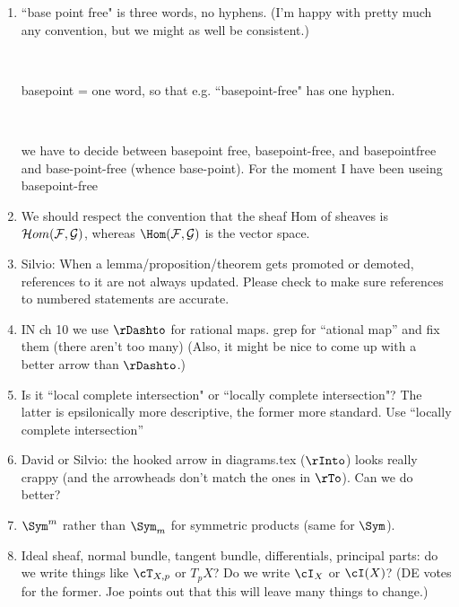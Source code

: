 \documentclass[12pt, leqno]{book}
\begin{document}
\begin{enumerate}
\item ``base point free" is three words, no hyphens. (I'm happy with pretty much any convention, but we might as well be consistent.) 

\

basepoint = one word, so that e.g. ``basepoint-free" has one hyphen.

\

we have to decide between basepoint free, basepoint-free, and basepointfree and base-point-free (whence base-point). For the moment I have been useing basepoint-free




\item We should respect the convention that the sheaf Hom of sheaves is
$\cH om(\cF,\cG)$, whereas $\Hom(\cF,\cG)$ is the vector space.

\item Silvio: When a lemma/proposition/theorem gets promoted or demoted, references to it are not always updated. Please check to make sure references to numbered statements are accurate. 


\item IN ch 10 we use $\rDashto$ for rational maps. grep for ``ational map'' and fix them (there aren't too many) (Also, it might be nice to come up with a better arrow than $\rDashto$.)

\item Is it ``local complete intersection" or ``locally complete intersection"? The latter is epsilonically more descriptive, the former more standard. Use ``locally complete intersection''

\item David or Silvio: the hooked arrow in diagrams.tex ($\rInto$) looks really crappy (and the arrowheads don't match the ones in $\rTo$). Can we do better?


\item $\Sym^{m}$ rather than $\Sym_{m}$ for symmetric products (same for $\Sym$).
\item Ideal sheaf, normal bundle, tangent bundle, differentials, principal parts: do we write things like 
$\cT_{X,p}$ or $T_{p}X$? Do we write $\cI_{X}$ or $\cI(X)$? (DE votes for the former. Joe points out that
this will leave many things to change.)


\end{enumerate}
\end{document}
